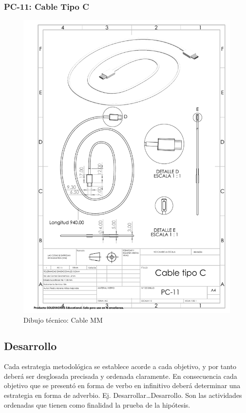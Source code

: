 \subsubsection{PC-11: Cable Tipo C }
\begin{figure}[H]
    \centering
    \includegraphics[trim = {7mm 1mm 1mm 1mm},clip,scale=0.4]{22/Img/cableCDibujo.PDF}
    \caption{Dibujo técnico: Cable MM}
    \label{fig:enter-label9}
\end{figure}



\subsection{Desarrollo}

Cada estrategia metodológica se establece acorde a cada objetivo, y por tanto deberá ser desglosada precisada y ordenada claramente. En consecuencia cada objetivo que se presentó en forma de verbo en infinitivo deberá determinar una estrategia en forma de adverbio. Ej. Desarrollar…Desarrollo. Son las actividades ordenadas que tienen como finalidad la prueba de la hipótesis. 

